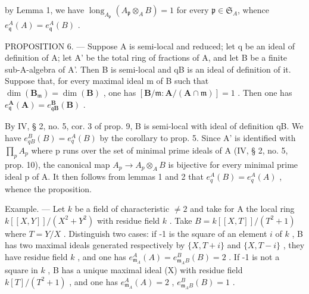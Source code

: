 by Lemma 1, we have \(\operatorname{long}_{A_{\mathfrak{p}}}(A_{\mathfrak{p}} \otimes_{A} B) = 1\) for every \(\mathfrak{p} \in \mathfrak{S}_{A}\), whence \(e_{\mathfrak{q}}^{A}(A) = e_{\mathfrak{q}}^{A}(B)\) .

PROPOSITION 6. --- Suppose A is semi-local and reduced; let q be an ideal of definition of A; let A' be the total ring of fractions of A, and let B be a finite sub-A-algebra of A'. Then B is semi-local and qB is an ideal of definition of it. Suppose that, for every maximal ideal m of B such that \(\dim(\mathbf{B}_{\mathfrak{m}})=\dim(\mathbf{B})\) , one has \([\mathbf{B}/\mathfrak{m}:\mathbf{A}/(\mathbf{A}\cap\mathfrak{m})]=1\) . Then one has \(e_{\mathfrak{q}}^{\mathbf{A}}(\mathbf{A})=e_{\mathfrak{q}\mathbf{B}}^{\mathbf{B}}(\mathbf{B})\) .

By IV, § 2, no. 5, cor. 3 of prop. 9, B is semi-local with ideal of definition qB. We have \(e_{qB}^{B}(B) = e_{q}^{A}(B)\) by the corollary to prop. 5. Since A' is identified with \(\prod_{p} A_p\) where p runs over the set of minimal prime ideals of A (IV, § 2, no. 5, prop. 10), the canonical map \(A_{p} \to A_{p} \otimes_{A} B\) is bijective for every minimal prime ideal p of A. It then follows from lemmas 1 and 2 that \(e_{q}^{A}(B) = e_{q}^{A}(A)\) , whence the proposition.

Example. --- Let \(k\) be a field of characteristic \(\neq 2\) and take for A the local ring \(k[[X, Y]]/(X^{2} + Y^{2})\) with residue field \(k\) . Take \(B = k[[X, T]]/(T^{2} + 1)\) where \(T = Y/X\) . Distinguish two cases: if -1 is the square of an element \(i\) of \(k\) , B has two maximal ideals generated respectively by \(\{X, T + i\}\) and \(\{X, T - i\}\) , they have residue field \(k\) , and one has \(e_{\mathfrak{m}_{A}}^{A}(A) = e_{\mathfrak{m}_{A}B}^{B}(B) = 2\) . If -1 is not a square in \(k\) , B has a unique maximal ideal (X) with residue field \(k[T]/(T^{2} + 1)\) , and one has \(e_{\mathfrak{m}_{A}}^{A}(A) = 2\) , \(e_{\mathfrak{m}_{A}B}^{B}(B) = 1\) .

